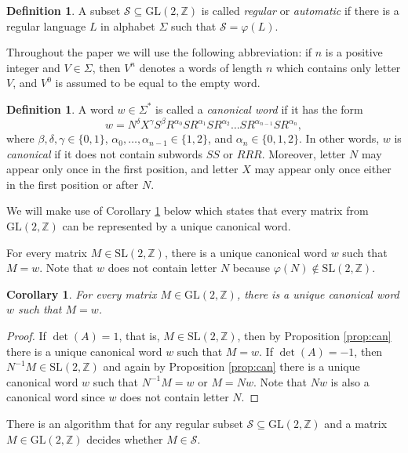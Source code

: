 \documentclass[fontsize=11pt,DIV=13,paper=letter]{scrartcl}
\newtheorem{corollary}[theorem]{Corollary}
\theoremstyle{definition}
\newtheorem{definition}[theorem]{Definition}
\newcommand{\sub}{\subseteq}
\newcommand{\Z}{\mathbb{Z}}
\newcommand{\s}{\mathcal{S}}
\newcommand{\SL}{\mathrm{SL}(2,\Z)}
\newcommand{\GL}{\mathrm{GL}(2,\Z)}
\renewcommand{\phi}{\varphi}
\begin{document}
\begin{definition}
A subset $\s\sub \GL$ is called \emph{regular} or \emph{automatic} if there is a regular language $L$ in alphabet $\Sigma$ such that $\s=\phi(L)$.
\end{definition}

Throughout the paper we will use the following abbreviation: if $n$ is a positive integer and $V\in \Sigma$, then $V^n$ denotes a words of length $n$ which contains only letter $V$, and $V^0$ is assumed to be equal to the empty word.

\begin{definition}
A word $w\in \Sigma^*$ is called a \emph{canonical word} if it has the form
\[
w=N^\delta X^\gamma S^{\beta}R^{\alpha_0}SR^{\alpha_1}SR^{\alpha_2}\dots SR^{\alpha_{n-1}}SR^{\alpha_n},
\]
where $\beta,\delta,\gamma\in \{0,1\}$, $\alpha_0,\dots,\alpha_{n-1}\in \{1,2\}$, and $\alpha_n\in \{0,1,2\}$. In other words, $w$ is \emph{canonical} if it does not contain subwords $SS$ or $RRR$. Moreover, letter $N$ may appear only once in the first position, and letter $X$ may appear only once either in the first position or after $N$.
\end{definition}

We will make use of Corollary \ref{cor:can} below which states that every matrix from $\GL$ can be represented by a unique canonical word.

\begin{proposition}\label{prop:can}
For every matrix $M\in \SL$, there is a unique canonical word $w$ such that $M=w$. Note that $w$ does not contain letter $N$ because $\phi(N)\notin \SL$.
\end{proposition}

\begin{corollary}\label{cor:can}
For every matrix $M\in \GL$, there is a unique canonical word $w$ such that $M=w$.
\end{corollary}

\begin{proof}
If $\det(A)=1$, that is, $M\in \SL$, then by Proposition \ref{prop:can} there is a unique canonical word $w$ such that $M=w$. If $\det(A)=-1$, then $N^{-1}M\in \SL$ and again by Proposition \ref{prop:can} there is a unique canonical word $w$ such that $N^{-1}M=w$ or $M=Nw$. Note that $Nw$ is also a canonical word since $w$ does not contain letter $N$.
\end{proof}

\begin{proposition}\label{MPReg}
There is an algorithm that for any regular subset $\s\sub \GL$ and a matrix $M\in \GL$ decides whether $M\in \s$.
\end{proposition}
\end{document}
